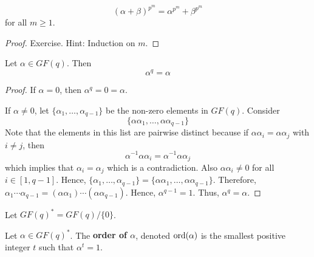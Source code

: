 \begin{thmbox}
    \begin{corollary}
        \[ (\alpha+\beta)^{p^m}=\alpha^{p^m}+\beta^{p^m} \]
        for all $ m\geqslant 1 $.
    \end{corollary}
\end{thmbox}

\begin{proof}
    Exercise. Hint: Induction on $ m $.
\end{proof}

\begin{thmbox}
    \begin{theorem}
        Let $ \alpha\in GF(q) $. Then
        \[ \alpha^q=\alpha \]
    \end{theorem}
\end{thmbox}

\begin{proof}
    If $ \alpha=0 $, then $ \alpha^q=0=\alpha $.

    If $ \alpha\neq 0 $, let $ \{\alpha_1,\ldots ,\alpha_{q-1}\} $ be the
    non-zero elements in $ GF(q) $. Consider
    \[ \{\alpha\alpha_1,\ldots,\alpha\alpha_{q-1}\} \]
    Note that the elements in this list are pairwise distinct because if
    $ \alpha\alpha_i=\alpha\alpha_j $ with $ i\neq j $, then
    \[ \alpha^{-1}\alpha\alpha_i=\alpha^{-1}\alpha\alpha_j \]
    which implies that $ \alpha_i=\alpha_j $ which is a contradiction.
    Also $ \alpha\alpha_i\neq 0 $ for all $ i\in [1,q-1] $.
    Hence, $ \{\alpha_1,\ldots ,\alpha_{q-1}\}=\{\alpha\alpha_1,\ldots ,\alpha\alpha_{q-1}\} $.
    Therefore, $ \alpha_1\cdots\alpha_{q-1}=(\alpha\alpha_1)\cdots(\alpha\alpha_{q-1}) $.
    Hence, $ \alpha^{q-1}=1 $. Thus, $ \alpha^q=\alpha $.
\end{proof}

\begin{defbox}
    \begin{definition}
        Let $ GF(q)^*=GF(q)/\{0\} $.
    \end{definition}
\end{defbox}

\begin{defbox}
    \begin{definition}
        Let $ \alpha\in GF(q)^* $. The \textbf{order of $\alpha$}, denoted
        $ \operatorname{ord}(\alpha) $ is the smallest positive integer $ t $ such that
        $ \alpha^t=1 $.
    \end{definition}
\end{defbox}


